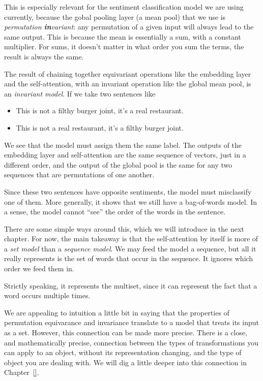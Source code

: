 \documentclass{pca}
\newenvironment{aside}{
	\setlength{\leftskip}{1em}\par\itshape
}{
	
	\setlength{\leftskip}{0em}\par
}
\theoremstyle{theorem}
\theoremstyle{definition}
\theoremstyle{proof}
\begin{document}
This is especially relevant for the sentiment classification model we are using currently, because the gobal pooling layer (a mean pool) that we use is \emph{permutation \textbf{in}variant}: any permutation of a given input will always lead to the same output. This is because the mean is essentially a sum, with a constant multiplier. For sums, it doesn't matter in what order you sum the terms, the result is always the same.

The result of chaining together equivariant operations like the embedding layer and the self-attention, with an invariant operation like the global mean pool, is an \emph{invariant model}. If we take two sentences like
\begin{itemize}
\item This is not a filthy burger joint, it's a real restaurant.
\item This is not a real restaurant, it's a filthy burger joint. 
\end{itemize}
We see that the model must assign them the same label. The outputs of the embedding layer and self-attention are the same sequence of vectors, just in a different order, and the output of the global pool is the same for any two sequences that are permutations of one another.

Since these two sentences have opposite sentiments, the model must misclassify one of them. More generally, it shows that we still have a bag-of-words model. In a sense, the model cannot ``see'' the order of the words in the sentence. 

There are some simple ways around this, which we will introduce in the next chapter. For now, the main takeaway is that the self-attention by itself is more of a \emph{set model} than a \emph{sequence model}. We may feed the model a sequence, but all it really represents is the set of words that occur in the sequence. It ignores which order we feed them in.

\begin{aside}
Strictly speaking, it represents the multiset, since it can represent the fact that a word occurs multiple times. 	
\end{aside}

We are appealing to intuition a little bit in saying that the properties of permutation equivarance and invariance translate to a model that treats its input as a set. However, this connection can be made more precise. There is a close, and mathematically precise, connection between the types of transformations you can apply to an object, without its representation changing, and the type of object you are dealing with. We will dig a little deeper into this connection in Chapter~\ref{}.
\end{document}
